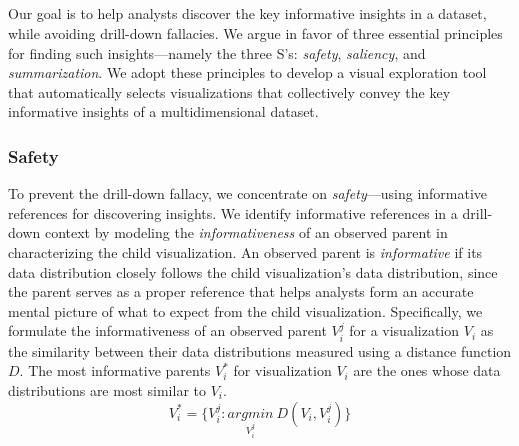 \subsection{}
Our goal is to help analysts discover the key informative insights in a dataset, while avoiding drill-down fallacies. We argue in favor of three essential principles for finding such insights---namely the three S's: \emph{safety}, \emph{saliency}, and \emph{summarization}. We adopt these principles to develop a visual exploration tool that automatically selects visualizations that collectively convey the key informative insights of a multidimensional dataset.
\subsubsection{Safety}
To prevent the drill-down fallacy, we concentrate on \emph{safety}---using informative references for discovering insights. We identify informative references in a drill-down context by modeling the \emph{informativeness} of an observed parent in characterizing the child visualization. An observed parent is \emph{informative} if its data distribution closely follows the child visualization's data distribution, since the parent serves as a proper reference that helps analysts form an accurate mental picture of what to expect from the child visualization. Specifically, we formulate the informativeness of an observed parent $V_i^j$ for a visualization $V_i$ as the similarity between their data distributions measured using a distance function $D$. The most informative parents $V_i^*$ for visualization $V_i$ are the ones whose data distributions are most similar to $V_i$.
\begin{equation}
    V_i^*=\{V_i^j : \underset{V_i^j}{argmin}\ D(V_i, V_i^j)\}
\end{equation}
